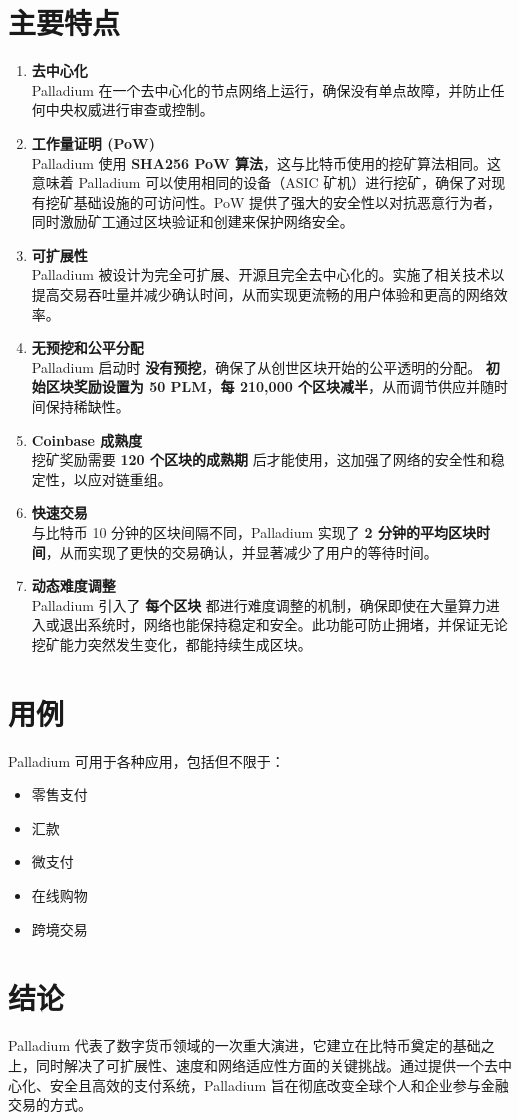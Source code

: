 \documentclass[11pt,a4paper]{article}
\begin{document}
\section{主要特点}
\begin{enumerate}
    \item \textbf{去中心化} \\ 
    Palladium 在一个去中心化的节点网络上运行，确保没有单点故障，并防止任何中央权威进行审查或控制。

    \item \textbf{工作量证明 (PoW)} \\ 
    Palladium 使用 \textbf{SHA256 PoW 算法}，这与比特币使用的挖矿算法相同。这意味着 Palladium 可以使用相同的设备（ASIC 矿机）进行挖矿，确保了对现有挖矿基础设施的可访问性。PoW 提供了强大的安全性以对抗恶意行为者，同时激励矿工通过区块验证和创建来保护网络安全。

    \item \textbf{可扩展性} \\ 
    Palladium 被设计为完全可扩展、开源且完全去中心化的。实施了相关技术以提高交易吞吐量并减少确认时间，从而实现更流畅的用户体验和更高的网络效率。

    \item \textbf{无预挖和公平分配} \\ 
    Palladium 启动时 \textbf{没有预挖}，确保了从创世区块开始的公平透明的分配。 \textbf{初始区块奖励设置为 50 PLM}，\textbf{每 210,000 个区块减半}，从而调节供应并随时间保持稀缺性。

    \item \textbf{Coinbase 成熟度} \\ 
    挖矿奖励需要 \textbf{120 个区块的成熟期} 后才能使用，这加强了网络的安全性和稳定性，以应对链重组。

    \item \textbf{快速交易} \\ 
    与比特币 10 分钟的区块间隔不同，Palladium 实现了 \textbf{2 分钟的平均区块时间}，从而实现了更快的交易确认，并显著减少了用户的等待时间。

    \item \textbf{动态难度调整} \\ 
    Palladium 引入了 \textbf{每个区块} 都进行难度调整的机制，确保即使在大量算力进入或退出系统时，网络也能保持稳定和安全。此功能可防止拥堵，并保证无论挖矿能力突然发生变化，都能持续生成区块。
\end{enumerate}

\section{用例}
Palladium 可用于各种应用，包括但不限于：
\begin{itemize}
    \item 零售支付
    \item 汇款
    \item 微支付
    \item 在线购物
    \item 跨境交易
\end{itemize}

\section{结论}
Palladium 代表了数字货币领域的一次重大演进，它建立在比特币奠定的基础之上，同时解决了可扩展性、速度和网络适应性方面的关键挑战。通过提供一个去中心化、安全且高效的支付系统，Palladium 旨在彻底改变全球个人和企业参与金融交易的方式。
\end{document}
